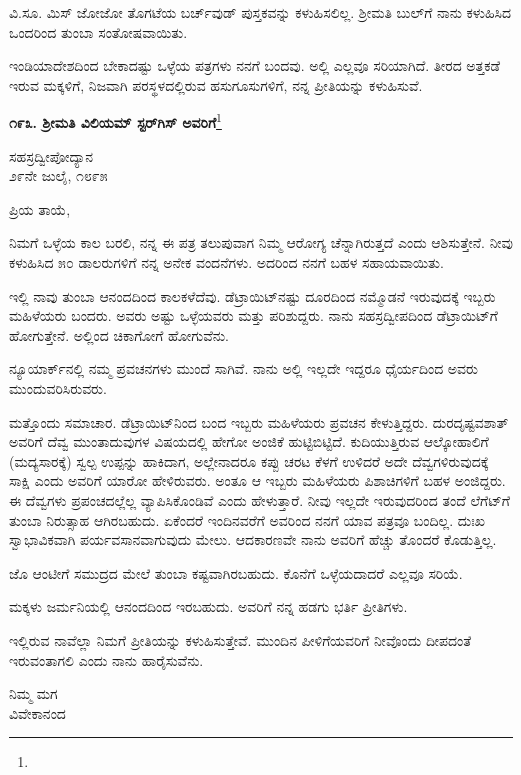 ವಿ.ಸೂ.\enginline{-} ಮಿಸ್ ಜೋಜೋ ತೊಗಟೆಯ ಬರ್ಚ್‌ವುಡ್ ಪುಸ್ತಕವನ್ನು ಕಳುಹಿಸಲಿಲ್ಲ. ಶ‍್ರೀಮತಿ ಬುಲ್‌ಗೆ ನಾನು ಕಳುಹಿಸಿದ ಒಂದರಿಂದ ತುಂಬಾ ಸಂತೋಷವಾಯಿತು.

ಇಂಡಿಯಾದೇಶದಿಂದ ಬೇಕಾದಷ್ಟು ಒಳ್ಳೆಯ ಪತ್ರಗಳು ನನಗೆ ಬಂದವು. ಅಲ್ಲಿ ಎಲ್ಲವೂ ಸರಿಯಾಗಿದೆ. ತೀರದ ಅತ್ತಕಡೆ ಇರುವ ಮಕ್ಕಳಿಗೆ, ನಿಜವಾಗಿ ಪರಸ್ಥಳದಲ್ಲಿರುವ ಹಸುಗೂಸುಗಳಿಗೆ, ನನ್ನ ಪ್ರೀತಿಯನ್ನು ಕಳುಹಿಸುವೆ.

\begin{center}
\textbf{೧೯೩. ಶ‍್ರೀಮತಿ ವಿಲಿಯಮ್ ಸ್ಟರ್‌ಗಿಸ್ ಅವರಿಗೆ}\footnote{}
\end{center}

\begin{flushright}
ಸಹಸ್ರದ್ವೀಪೋದ್ಯಾನ\\೨೯ನೇ ಜುಲೈ, ೧೮೯೫
\end{flushright}

\noindent
ಪ್ರಿಯ ತಾಯೆ,

ನಿಮಗೆ ಒಳ್ಳೆಯ ಕಾಲ ಬರಲಿ, ನನ್ನ ಈ ಪತ್ರ ತಲುಪುವಾಗ ನಿಮ್ಮ ಆರೋಗ್ಯ ಚೆನ್ನಾಗಿರುತ್ತದೆ ಎಂದು ಆಶಿಸುತ್ತೇನೆ. ನೀವು ಕಳುಹಿಸಿದ ೫೦ ಡಾಲರುಗಳಿಗೆ ನನ್ನ ಅನೇಕ ವಂದನೆಗಳು. ಅದರಿಂದ ನನಗೆ ಬಹಳ ಸಹಾಯವಾಯಿತು.

ಇಲ್ಲಿ ನಾವು ತುಂಬಾ ಆನಂದದಿಂದ ಕಾಲಕಳೆದೆವು. ಡೆಟ್ರಾಯಿಟ್‌ನಷ್ಟು ದೂರದಿಂದ ನಮ್ಮೊಡನೆ ಇರುವುದಕ್ಕೆ ಇಬ್ಬರು ಮಹಿಳೆಯರು ಬಂದರು. ಅವರು ಅಷ್ಟು ಒಳ್ಳೆಯವರು ಮತ್ತು ಪರಿಶುದ್ದರು. ನಾನು ಸಹಸ್ರದ್ವೀಪದಿಂದ ಡೆಟ್ರಾಯಿಟ್‌ಗೆ ಹೋಗುತ್ತೇನೆ. ಅಲ್ಲಿಂದ ಚಿಕಾಗೋಗೆ ಹೋಗುವೆನು.

ನ್ಯೂಯಾರ್ಕ್‌ನಲ್ಲಿ ನಮ್ಮ ಪ್ರವಚನಗಳು ಮುಂದೆ ಸಾಗಿವೆ. ನಾನು ಅಲ್ಲಿ ಇಲ್ಲದೇ ಇದ್ದರೂ ಧೈರ್ಯದಿಂದ ಅವರು ಮುಂದುವರಿಸಿರುವರು.

ಮತ್ತೊಂದು ಸಮಾಚಾರ. ಡೆಟ್ರಾಯಿಟ್‌ನಿಂದ ಬಂದ ಇಬ್ಬರು ಮಹಿಳೆಯರು ಪ್ರವಚನ ಕೇಳುತ್ತಿದ್ದರು. ದುರದೃಷ್ಟವಶಾತ್ ಅವರಿಗೆ ದೆವ್ವ ಮುಂತಾದುವುಗಳ ವಿಷಯದಲ್ಲಿ ಹೇಗೋ ಅಂಜಿಕೆ ಹುಟ್ಟಿಬಿಟ್ಟಿದೆ. ಕುದಿಯುತ್ತಿರುವ ಆಲ್ಕೋಹಾಲಿಗೆ (ಮದ್ಯಸಾರಕ್ಕೆ) ಸ್ವಲ್ಪ ಉಪ್ಪನ್ನು ಹಾಕಿದಾಗ, ಅಲ್ಲೇನಾದರೂ ಕಪ್ಪು ಚರಟ ಕೆಳಗೆ ಉಳಿದರೆ ಅದೇ ದೆವ್ವಗಳಿರುವುದಕ್ಕೆ ಸಾಕ್ಷಿ ಎಂದು ಅವರಿಗೆ ಯಾರೋ ಹೇಳಿರುವರು. ಅಂತೂ ಆ ಇಬ್ಬರು ಮಹಿಳೆಯರು ಪಿಶಾಚಿಗಳಿಗೆ ಬಹಳ ಅಂಜಿದ್ದರು. ಈ ದೆವ್ವಗಳು ಪ್ರಪಂಚದಲ್ಲೆಲ್ಲ ವ್ಯಾಪಿಸಿಕೊಂಡಿವೆ ಎಂದು ಹೇಳುತ್ತಾರೆ. ನೀವು ಇಲ್ಲದೇ ಇರುವುದರಿಂದ ತಂದೆ ಲೆಗೆಟ್‌ಗೆ ತುಂಬಾ ನಿರುತ್ಸಾಹ ಆಗಿರಬಹುದು. ಏಕೆಂದರೆ ಇಂದಿನವರೆಗೆ ಅವರಿಂದ ನನಗೆ ಯಾವ ಪತ್ರವೂ ಬಂದಿಲ್ಲ. ದುಃಖ ಸ್ವಾಭಾವಿಕವಾಗಿ ಪರ್ಯವಸಾನವಾಗುವುದು ಮೇಲು. ಆದಕಾರಣವೇ ನಾನು ಅವರಿಗೆ ಹೆಚ್ಚು ತೊಂದರೆ ಕೊಡುತ್ತಿಲ್ಲ.

ಜೊ ಆಂಟೀಗೆ ಸಮುದ್ರದ ಮೇಲೆ ತುಂಬಾ ಕಷ್ಟವಾಗಿರಬಹುದು. ಕೊನೆಗೆ ಒಳ್ಳೆಯದಾದರೆ ಎಲ್ಲವೂ ಸರಿಯೆ.

ಮಕ್ಕಳು ಜರ್ಮನಿಯಲ್ಲಿ ಆನಂದದಿಂದ ಇರಬಹುದು. ಅವರಿಗೆ ನನ್ನ ಹಡಗು ಭರ್ತಿ ಪ್ರೀತಿಗಳು.

ಇಲ್ಲಿರುವ ನಾವೆಲ್ಲಾ ನಿಮಗೆ ಪ್ರೀತಿಯನ್ನು ಕಳುಹಿಸುತ್ತೇವೆ. ಮುಂದಿನ ಪೀಳಿಗೆಯವರಿಗೆ ನೀವೊಂದು ದೀಪದಂತೆ ಇರುವಂತಾಗಲಿ ಎಂದು ನಾನು ಹಾರೈಸುವೆನು.

{\flushright
ನಿಮ್ಮ ಮಗ\\ವಿವೇಕಾನಂದ\par}


